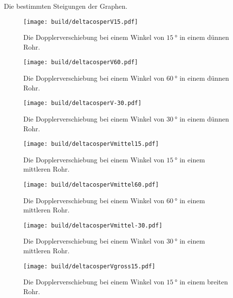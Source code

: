 \begin{table}
 \centering
 \caption{Die bestimmten Steigungen der Graphen.}
 
 \label{tab:steigungen}
\end{table}

\begin{figure}
 \centering
 \caption{Die Dopplerverschiebung bei einem Winkel von $\SI{15}{\degree}$ in einem dünnen Rohr.}
 \texttt{[image: build/deltacosperV15.pdf]}
 \label{fig:k15}
\end{figure}

\begin{figure}
 \centering
 \caption{Die Dopplerverschiebung bei einem Winkel von $\SI{60}{\degree}$ in einem dünnen Rohr.}
 \texttt{[image: build/deltacosperV60.pdf]}
 \label{fig:k60}
\end{figure}

\begin{figure}
 \centering
 \caption{Die Dopplerverschiebung bei einem Winkel von $\SI{30}{\degree}$ in einem dünnen Rohr.}
 \texttt{[image: build/deltacosperV-30.pdf]}
 \label{fig:k30}
\end{figure}

\begin{figure}
 \centering
 \caption{Die Dopplerverschiebung bei einem Winkel von $\SI{15}{\degree}$ in einem mittleren Rohr.}
 \texttt{[image: build/deltacosperVmittel15.pdf]}
 \label{fig:m15}
\end{figure}

\begin{figure}
 \centering
 \caption{Die Dopplerverschiebung bei einem Winkel von $\SI{60}{\degree}$ in einem mittleren Rohr.}
 \texttt{[image: build/deltacosperVmittel60.pdf]}
 \label{fig:m60}
\end{figure}

\begin{figure}
 \centering
 \caption{Die Dopplerverschiebung bei einem Winkel von $\SI{30}{\degree}$ in einem mittleren Rohr.}
 \texttt{[image: build/deltacosperVmittel-30.pdf]}
 \label{fig:m30}
\end{figure}

\begin{figure}
 \centering
 \caption{Die Dopplerverschiebung bei einem Winkel von $\SI{15}{\degree}$ in einem breiten Rohr.}
 \texttt{[image: build/deltacosperVgross15.pdf]}
 \label{fig:g15}
\end{figure}

